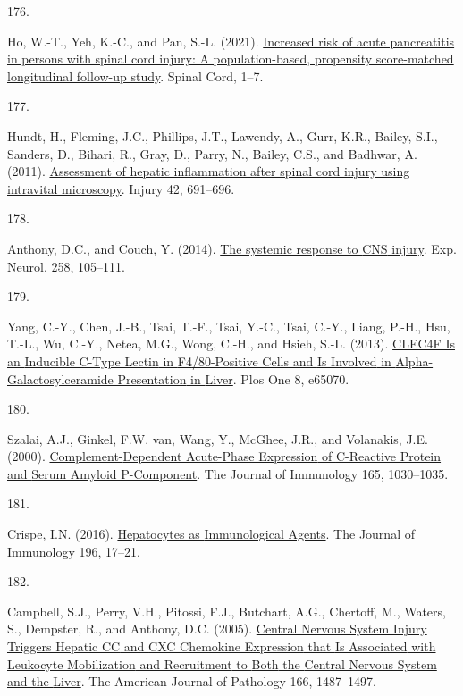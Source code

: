 \documentclass[
]{article}
\newlength{\cslhangindent}
\newlength{\csllabelwidth}
\newlength{\cslentryspacingunit} %
\newenvironment{CSLReferences}[2] %
 {%
  \setlength{\parindent}{0pt}
  \ifodd #1
  \let\oldpar\par
  \def\par{\hangindent=\cslhangindent\oldpar}
  \fi
  \setlength{\parskip}{#2\cslentryspacingunit}
 }%
 {}
\newcommand{\CSLLeftMargin}[1]{\parbox[t]{\csllabelwidth}{#1}}
\newcommand{\CSLRightInline}[1]{\parbox[t]{\linewidth - \csllabelwidth}{#1}\break}
\begin{document}
\begin{CSLReferences}{0}{0}
\leavevmode{}%
\CSLLeftMargin{176. }
\CSLRightInline{Ho, W.-T., Yeh, K.-C., and Pan, S.-L. (2021). \href{https://doi.org/10.1038/s41393-021-00643-3}{Increased risk of acute pancreatitis in persons with spinal cord injury: A population-based, propensity score-matched longitudinal follow-up study}. Spinal Cord, 1--7.}

\leavevmode{}%
\CSLLeftMargin{177. }
\CSLRightInline{Hundt, H., Fleming, J.C., Phillips, J.T., Lawendy, A., Gurr, K.R., Bailey, S.I., Sanders, D., Bihari, R., Gray, D., Parry, N., Bailey, C.S., and Badhwar, A. (2011). \href{https://doi.org/10.1016/j.injury.2010.12.013}{Assessment of hepatic inflammation after spinal cord injury using intravital microscopy}. Injury 42, 691--696.}

\leavevmode{}%
\CSLLeftMargin{178. }
\CSLRightInline{Anthony, D.C., and Couch, Y. (2014). \href{https://doi.org/10.1016/j.expneurol.2014.03.013}{The systemic response to {CNS} injury}. Exp. Neurol. 258, 105--111.}

\leavevmode{}%
\CSLLeftMargin{179. }
\CSLRightInline{Yang, C.-Y., Chen, J.-B., Tsai, T.-F., Tsai, Y.-C., Tsai, C.-Y., Liang, P.-H., Hsu, T.-L., Wu, C.-Y., Netea, M.G., Wong, C.-H., and Hsieh, S.-L. (2013). \href{https://doi.org/10.1371/journal.pone.0065070}{{CLEC4F Is} an {Inducible C-Type Lectin} in {F4}/80-{Positive Cells} and {Is Involved} in {Alpha-Galactosylceramide Presentation} in {Liver}}. Plos One 8, e65070.}

\leavevmode{}%
\CSLLeftMargin{180. }
\CSLRightInline{Szalai, A.J., Ginkel, F.W. van, Wang, Y., McGhee, J.R., and Volanakis, J.E. (2000). \href{https://doi.org/10.4049/jimmunol.165.2.1030}{Complement-{Dependent Acute-Phase Expression} of {C-Reactive Protein} and {Serum Amyloid P-Component}}. The Journal of Immunology 165, 1030--1035.}

\leavevmode{}%
\CSLLeftMargin{181. }
\CSLRightInline{Crispe, I.N. (2016). \href{https://doi.org/10.4049/jimmunol.1501668}{Hepatocytes as {Immunological Agents}}. The Journal of Immunology 196, 17--21.}

\leavevmode{}%
\CSLLeftMargin{182. }
\CSLRightInline{Campbell, S.J., Perry, V.H., Pitossi, F.J., Butchart, A.G., Chertoff, M., Waters, S., Dempster, R., and Anthony, D.C. (2005). \href{https://doi.org/10.1016/S0002-9440(10)62365-6}{Central {Nervous System Injury Triggers Hepatic CC} and {CXC Chemokine Expression} that {Is Associated} with {Leukocyte Mobilization} and {Recruitment} to {Both} the {Central Nervous System} and the {Liver}}. The American Journal of Pathology 166, 1487--1497.}


\end{CSLReferences}
\end{document}
